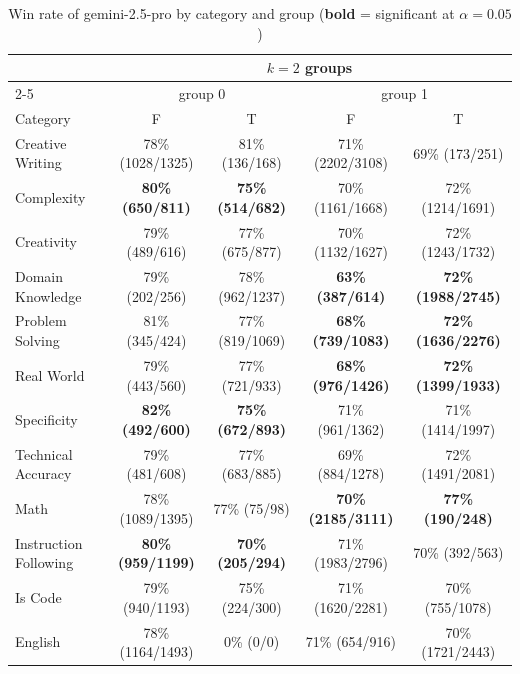 \begin{table}[ht]
\centering
\scriptsize
\setlength{\tabcolsep}{3pt}
\renewcommand{\arraystretch}{1.2}
\caption{Win rate of gemini-2.5-pro by category and group (\textbf{bold} = significant at $\alpha=0.05$)}
\label{tab:winrate_2}
\begin{tabular}{lcccc}
\toprule
 & \multicolumn{4}{c}{$k=2$ groups} \\
\cmidrule(lr){2-5}
 & \multicolumn{2}{c}{group 0} & \multicolumn{2}{c}{group 1} \\
Category & F & T & F & T \\
\midrule
Creative Writing & 78\% (1028/1325) & 81\% (136/168) & 71\% (2202/3108) & 69\% (173/251) \\
Complexity & \textbf{80\% (650/811)} & \textbf{75\% (514/682)} & 70\% (1161/1668) & 72\% (1214/1691) \\
Creativity & 79\% (489/616) & 77\% (675/877) & 70\% (1132/1627) & 72\% (1243/1732) \\
Domain Knowledge & 79\% (202/256) & 78\% (962/1237) & \textbf{63\% (387/614)} & \textbf{72\% (1988/2745)} \\
Problem Solving & 81\% (345/424) & 77\% (819/1069) & \textbf{68\% (739/1083)} & \textbf{72\% (1636/2276)} \\
Real World & 79\% (443/560) & 77\% (721/933) & \textbf{68\% (976/1426)} & \textbf{72\% (1399/1933)} \\
Specificity & \textbf{82\% (492/600)} & \textbf{75\% (672/893)} & 71\% (961/1362) & 71\% (1414/1997) \\
Technical Accuracy & 79\% (481/608) & 77\% (683/885) & 69\% (884/1278) & 72\% (1491/2081) \\
Math & 78\% (1089/1395) & 77\% (75/98) & \textbf{70\% (2185/3111)} & \textbf{77\% (190/248)} \\
Instruction Following & \textbf{80\% (959/1199)} & \textbf{70\% (205/294)} & 71\% (1983/2796) & 70\% (392/563) \\
Is Code & 79\% (940/1193) & 75\% (224/300) & 71\% (1620/2281) & 70\% (755/1078) \\
English & 78\% (1164/1493) & 0\% (0/0) & 71\% (654/916) & 70\% (1721/2443) \\
\bottomrule
\end{tabular}
\end{table}
